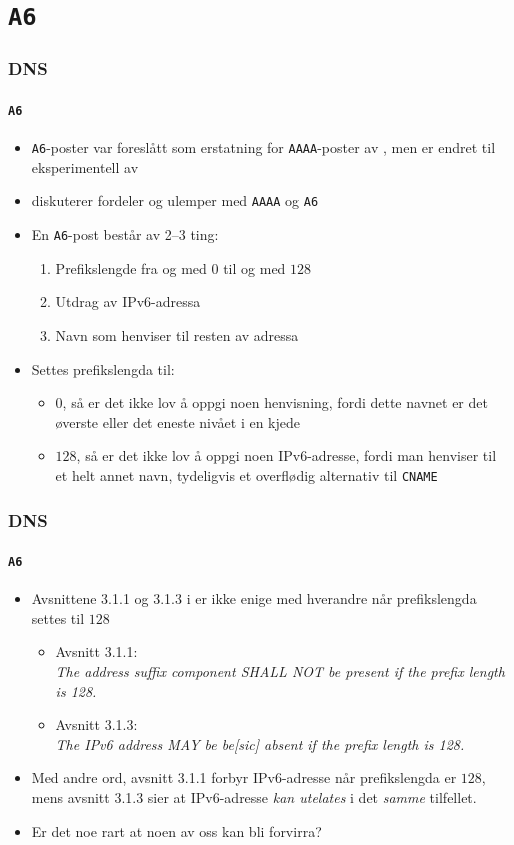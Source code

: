 \section{\texttt{A6}}
\begin{frame}%
  \frametitle{DNS}
  \framesubtitle{\texttt{A6}}
  \pause
  \begin{itemize}[<+->]
  \item \texttt{A6}-poster var foreslått som erstatning for
    \texttt{AAAA}-poster av , men er endret til
    eksperimentell av 
  \item {} diskuterer
    fordeler og ulemper med \texttt{AAAA} og \texttt{A6}
  \item En \texttt{A6}-post består av 2--3 ting:
    \begin{enumerate}[<+->]
    \item Prefikslengde fra og med \(0\) til og med \(128\)
    \item Utdrag av IPv6-adressa
    \item Navn som henviser til resten av adressa
    \end{enumerate}
  \item Settes prefikslengda til:
    \begin{itemize}[<+->]
    \item \(0\), så er det \alert{ikke} lov å oppgi noen henvisning,
      fordi dette navnet er det øverste eller det eneste nivået i en
      kjede
    \item \(128\), så er det \alert{ikke} lov å oppgi noen IPv6-adresse,
      fordi man henviser til et helt annet navn, tydeligvis et
      overflødig alternativ til \texttt{CNAME}
    \end{itemize}
  \end{itemize}
\end{frame}

\begin{frame}%
  \frametitle{DNS}
  \framesubtitle{\texttt{A6}}
  \begin{itemize}[<+->]
  \item Avsnittene 3.1.1 og 3.1.3 i  er ikke enige med
    hverandre når prefikslengda settes til \(128\)
    \begin{itemize}[<+->]
    \item Avsnitt 3.1.1:\\
      \textit{The address suffix component SHALL NOT be present if the prefix
      length is 128.\/}
  \item Avsnitt 3.1.3:\\
    \textit{The IPv6 address MAY be be\textnormal{[sic]} absent if the
      prefix length is 128.\/}
    \end{itemize}
  \item Med andre ord, avsnitt 3.1.1 forbyr IPv6-adresse når
    prefikslengda er \(128\), mens avsnitt 3.1.3 sier at IPv6-adresse
    \textit{kan utelates\/} i det \textit{samme\/} tilfellet.
  \item Er det noe rart at noen av oss kan bli forvirra?
  \end{itemize}
\end{frame}

